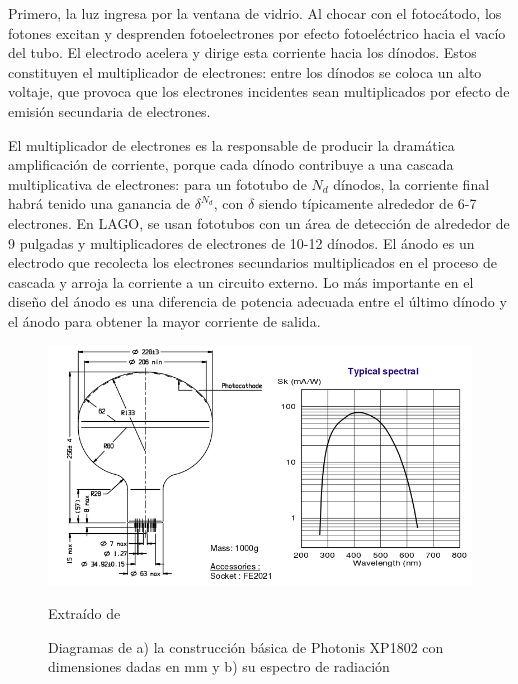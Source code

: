\documentclass{book}
\begin{document}
Primero, la  luz ingresa por la ventana de vidrio. Al chocar con el fotoc\'atodo, los fotones excitan y desprenden fotoelectrones por efecto fotoel\'ectrico hacia el vac\'io del tubo. El electrodo acelera y dirige esta corriente hacia los d\'inodos. Estos constituyen el multiplicador de electrones: entre los d\'inodos se coloca un alto voltaje, que provoca que los electrones incidentes sean multiplicados por efecto de emisi\'on secundaria de electrones. \citep{Hamamatsu}

El multiplicador de electrones es la responsable de producir la dram\'atica amplificaci\'on de corriente, porque cada d\'inodo contribuye a una cascada multiplicativa de electrones: para un fototubo de $N_d$ d\'inodos, la corriente final habr\'a tenido una ganancia de $\delta^{N_d}$, con $\delta$ siendo t\'ipicamente alrededor de 6-7 electrones. En LAGO, se usan fototubos con un \'area de detecci\'on de alrededor de 9 pulgadas y multiplicadores de electrones de 10-12 d\'inodos. El \'anodo es un electrodo que recolecta los electrones secundarios multiplicados en el proceso de cascada y arroja la corriente a un circuito externo. Lo m\'as importante en el dise\~no del \'anodo es una diferencia de potencia adecuada entre el \'ultimo d\'inodo y el \'anodo para obtener la mayor corriente de salida. \citep{Hamamatsu}

\begin{figure}[ht] %
\begin{center}
 \includegraphics[width =0.8\linewidth]{PhotonisXP1802.png}
 
 Extra\'ido de \citep{Photonis}
\caption{Diagramas de a) la construcci\'on b\'asica de Photonis XP1802 con dimensiones dadas en mm y b) su espectro de radiaci\'on}
\end{center}
\end{figure}
\end{document}
